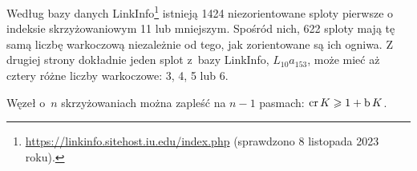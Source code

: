 Według bazy danych LinkInfo\footnote{\url{https://linkinfo.sitehost.iu.edu/index.php} (sprawdzono 8 listopada 2023 roku).} istnieją 1424 niezorientowane sploty pierwsze o indeksie skrzyżowaniowym 11 lub mniejszym.
Spośród nich, 622 sploty mają tę samą liczbę warkoczową niezależnie od tego, jak zorientowane są ich ogniwa.   
Z drugiej strony dokładnie jeden splot z~bazy LinkInfo, $L_{10}a_{153}$, może mieć aż cztery różne liczby warkoczowe: 3, 4, 5 lub 6.

\begin{proposition}
    Węzeł o~$n$ skrzyżowaniach można zapleść na $n - 1$ pasmach: $\operatorname{cr} K \geqslant 1 + \operatorname{b} K$.
\end{proposition}

